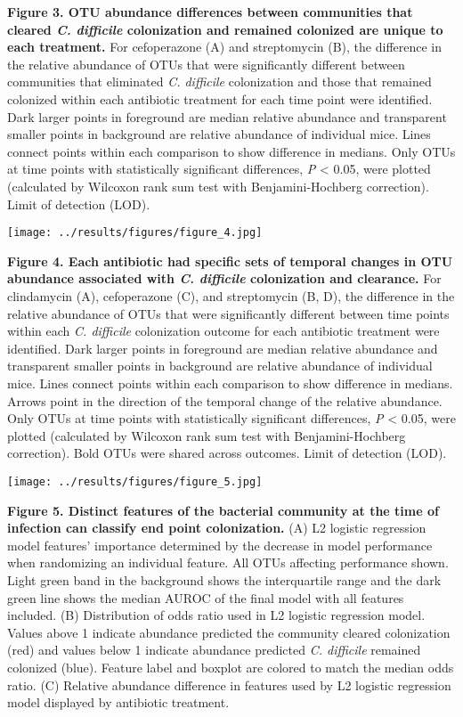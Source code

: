 \documentclass[11pt,]{article}
\begin{document}
\textbf{Figure 3. OTU abundance differences between communities that
cleared \emph{C. difficile} colonization and remained colonized are
unique to each treatment.} For cefoperazone (A) and streptomycin (B),
the difference in the relative abundance of OTUs that were significantly
different between communities that eliminated \emph{C. difficile}
colonization and those that remained colonized within each antibiotic
treatment for each time point were identified. Dark larger points in
foreground are median relative abundance and transparent smaller points
in background are relative abundance of individual mice. Lines connect
points within each comparison to show difference in medians. Only OTUs
at time points with statistically significant differences, \emph{P}
\textless{} 0.05, were plotted (calculated by Wilcoxon rank sum test
with Benjamini-Hochberg correction). Limit of detection (LOD).

\hfill\break

\texttt{[image: ../results/figures/figure\_4.jpg]}

\textbf{Figure 4. Each antibiotic had specific sets of temporal changes
in OTU abundance associated with \emph{C. difficile} colonization and
clearance.} For clindamycin (A), cefoperazone (C), and streptomycin (B,
D), the difference in the relative abundance of OTUs that were
significantly different between time points within each \emph{C.
difficile} colonization outcome for each antibiotic treatment were
identified. Dark larger points in foreground are median relative
abundance and transparent smaller points in background are relative
abundance of individual mice. Lines connect points within each
comparison to show difference in medians. Arrows point in the direction
of the temporal change of the relative abundance. Only OTUs at time
points with statistically significant differences, \emph{P} \textless{}
0.05, were plotted (calculated by Wilcoxon rank sum test with
Benjamini-Hochberg correction). Bold OTUs were shared across outcomes.
Limit of detection (LOD).

\hfill\break

\texttt{[image: ../results/figures/figure\_5.jpg]}

\textbf{Figure 5. Distinct features of the bacterial community at the
time of infection can classify end point colonization.} (A) L2 logistic
regression model features' importance determined by the decrease in
model performance when randomizing an individual feature. All OTUs
affecting performance shown. Light green band in the background shows
the interquartile range and the dark green line shows the median AUROC
of the final model with all features included. (B) Distribution of odds
ratio used in L2 logistic regression model. Values above 1 indicate
abundance predicted the community cleared colonization (red) and values
below 1 indicate abundance predicted \emph{C. difficile} remained
colonized (blue). Feature label and boxplot are colored to match the
median odds ratio. (C) Relative abundance difference in features used by
L2 logistic regression model displayed by antibiotic treatment.
\end{document}
